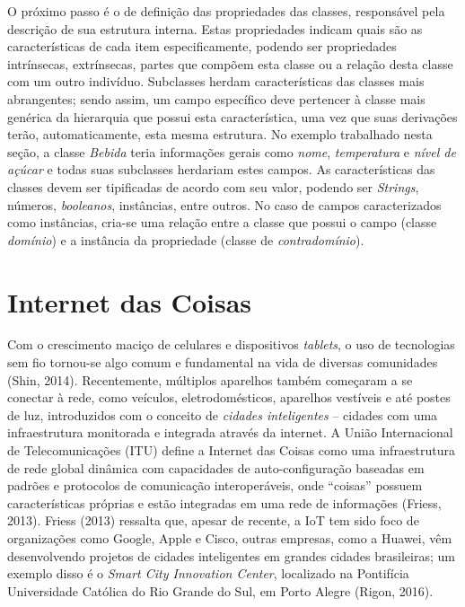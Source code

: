 O próximo passo é o de definição das propriedades das classes, responsável pela descrição de sua estrutura interna. Estas propriedades indicam quais são as características de cada item especificamente, podendo ser propriedades intrínsecas, extrínsecas, partes que compõem esta classe ou a relação desta classe com um outro indivíduo. Subclasses herdam características das classes mais abrangentes; sendo assim, um campo específico deve pertencer à classe mais genérica da hierarquia que possui esta característica, uma vez que suas derivações terão, automaticamente, esta mesma estrutura. No exemplo trabalhado nesta seção, a classe \emph{Bebida} teria informações gerais como \emph{nome}, \emph{temperatura} e \emph{nível de açúcar} e todas suas subclasses herdariam estes campos. As características das classes devem ser tipificadas de acordo com seu valor, podendo ser \emph{Strings}, números, \emph{booleanos}, instâncias, entre outros. No caso de campos caracterizados como instâncias, cria-se uma relação entre a classe que possui o campo (classe \emph{domínio}) e a instância da propriedade (classe de \emph{contradomínio}).

\section{Internet das Coisas}
Com o crescimento maciço de celulares e dispositivos \emph{tablets}, o uso de tecnologias sem fio tornou-se algo comum e fundamental na vida de diversas comunidades (Shin, 2014)\nocite{SHIN2014}. Recentemente, múltiplos aparelhos também começaram a se conectar à rede, como veículos, eletrodomésticos, aparelhos vestíveis e até postes de luz, introduzidos com o conceito de \emph{cidades inteligentes} -- cidades com uma infraestrutura monitorada e integrada através da internet. A União Internacional de Telecomunicações (ITU) define a Internet das Coisas como uma infraestrutura de rede global dinâmica com capacidades de auto-configuração baseadas em padrões e protocolos de comunicação interoperáveis, onde “coisas” possuem características próprias e estão integradas em uma rede de informações (Friess, 2013)\nocite{FRIESS2013}. Friess (2013) ressalta que, apesar de recente, a IoT tem sido foco de organizações como Google, Apple e Cisco, outras empresas, como a Huawei, vêm desenvolvendo projetos de cidades inteligentes em grandes cidades brasileiras; um exemplo disso é o \emph{Smart City Innovation Center}, localizado na Pontifícia Universidade Católica do Rio Grande do Sul, em Porto Alegre (Rigon, 2016)\nocite{RIGON2016}.

